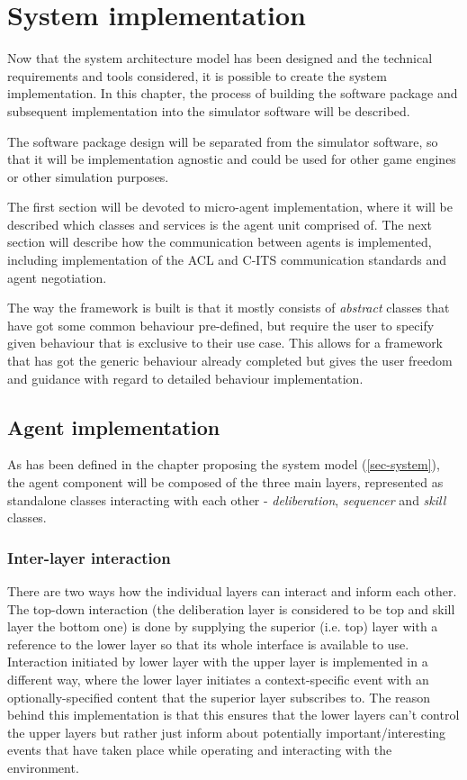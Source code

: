 \documentclass[main.tex]{subfiles}
\begin{document}
\section{System implementation}

Now that the system architecture model has been designed and the technical requirements and
tools considered, it is possible to create the system implementation. In this chapter, the
process of building the software package and subsequent implementation into the simulator
software will be described. 

The software package design will be separated from the simulator software, so that it will be 
implementation agnostic and could be used for other game engines or other simulation purposes. 

The first section will be devoted to micro-agent implementation, where it will be described which 
classes and services is the agent unit comprised of. The next section will describe how the 
communication between agents is implemented, including implementation of the ACL and C-ITS communication 
standards and agent negotiation. 

The way the framework is built is that it mostly consists of \emph{abstract} classes that have got some 
common behaviour pre-defined, but require the user to specify given behaviour that is exclusive to their 
use case. This allows for a framework that has got the generic behaviour already completed but 
gives the user freedom and guidance with regard to detailed behaviour implementation. 

\subsection{Agent implementation}

As has been defined in the chapter proposing the system model (\ref{sec-system}), the agent component 
will be composed of the three main layers, represented as standalone classes interacting with 
each other - \emph{deliberation}, \emph{sequencer} and \emph{skill} classes.

\subsubsection{Inter-layer interaction}

There are two ways how the individual layers can interact and inform each other. The top-down 
interaction (the deliberation layer is considered to be top and skill layer the bottom one) 
is done by supplying the superior (i.e. top) layer with a reference to the lower layer so that 
its whole interface is available to use. Interaction initiated by lower layer with the upper layer 
is implemented in a different way, where the lower layer initiates a context-specific event with an 
optionally-specified content that the superior layer subscribes to. The reason behind this implementation
is that this ensures that the lower layers can't control the upper layers but rather just inform about 
potentially important/interesting events that have taken place while operating and interacting with 
the environment.
\end{document}
